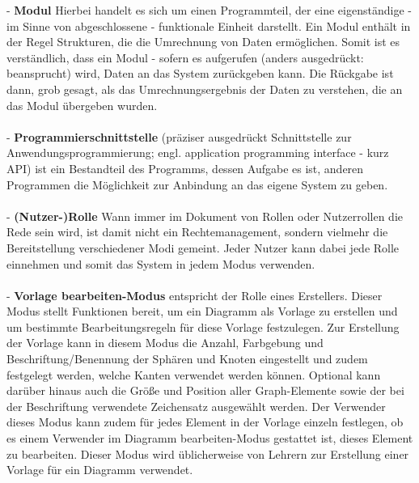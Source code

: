 \documentclass[enabledeprecatedfontcommands,fontsize=11pt,paper=a4,twoside]{scrartcl}
\newcounter{one}
\begin{document}
- \textbf{Modul} Hierbei handelt es sich um einen Programmteil, der eine eigenständige - im Sinne von abgeschlossene - funktionale Einheit darstellt. Ein Modul enthält in der Regel Strukturen, die die Umrechnung von Daten ermöglichen. Somit ist es verständlich, dass ein Modul - sofern es aufgerufen (anders ausgedrückt: beansprucht) wird, Daten an das System zurückgeben kann. Die Rückgabe ist dann, grob gesagt, als das Umrechnungsergebnis der Daten zu verstehen, die an das Modul übergeben wurden. \\ \\
- \textbf{Programmierschnittstelle} (präziser ausgedrückt Schnittstelle zur Anwendungsprogrammierung; engl. application programming interface - kurz API) ist ein Bestandteil des Programms, dessen Aufgabe es ist, anderen Programmen die Möglichkeit zur Anbindung an das eigene System zu geben.\\ \\
- \textbf{(Nutzer-)Rolle} Wann immer im Dokument von Rollen oder Nutzerrollen die Rede sein wird, ist damit nicht ein Rechtemanagement, sondern vielmehr die Bereitstellung verschiedener Modi gemeint. Jeder Nutzer kann dabei jede Rolle einnehmen und somit das System in jedem Modus verwenden. \\ \\
- \textbf{\hypertarget{``Vorlage bearbeiten''-Modus}{\glqq Vorlage bearbeiten\grqq -Modus}} entspricht der Rolle eines Erstellers. Dieser Modus stellt Funktionen bereit, um ein Diagramm als Vorlage zu erstellen und um bestimmte Bearbeitungsregeln für diese Vorlage festzulegen. Zur Erstellung der Vorlage kann in diesem Modus die Anzahl, Farbgebung und Beschriftung/Benennung der Sphären und Knoten eingestellt und zudem festgelegt werden, welche Kanten verwendet werden können. Optional kann darüber hinaus auch die Größe und Position aller Graph-Elemente sowie der bei der Beschriftung verwendete Zeichensatz ausgewählt werden. Der Verwender dieses Modus kann zudem für jedes Element in der Vorlage einzeln festlegen, ob es einem Verwender im \glqq Diagramm bearbeiten\grqq-Modus gestattet ist, dieses Element zu bearbeiten. Dieser Modus wird üblicherweise von Lehrern zur Erstellung einer Vorlage für ein Diagramm verwendet. \\ \\
\end{document}
